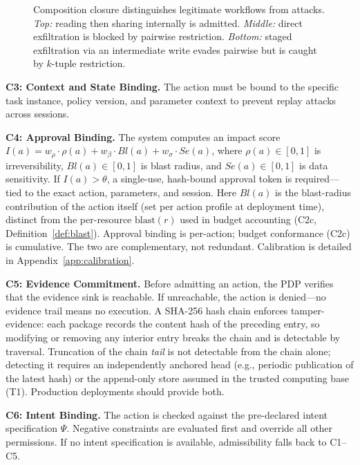 \documentclass[sigconf,nonacm]{acmart}
\begin{document}
\begin{figure}[t]
\caption{Composition closure distinguishes legitimate workflows from attacks. \emph{Top:} reading then sharing internally is admitted. \emph{Middle:} direct exfiltration is blocked by pairwise restriction. \emph{Bottom:} staged exfiltration via an intermediate write evades pairwise but is caught by $k$-tuple restriction.}
\label{fig:composition}
\end{figure}

\textbf{C3: Context and State Binding.} The action must be bound to the specific task instance, policy version, and parameter context to prevent replay attacks across sessions.

\textbf{C4: Approval Binding.} The system computes an impact score $I(a) = w_\rho \cdot \rho(a) + w_\beta \cdot Bl(a) + w_\sigma \cdot Se(a)$, where $\rho(a) \in [0,1]$ is irreversibility, $Bl(a) \in [0,1]$ is blast radius, and $Se(a) \in [0,1]$ is data sensitivity. If $I(a) > \theta$, a single-use, hash-bound approval token is required---tied to the exact action, parameters, and session. Here $Bl(a)$ is the blast-radius contribution of the action itself (set per action profile at deployment time), distinct from the per-resource $\mathrm{blast}(r)$ used in budget accounting (C2c, Definition~\ref{def:blast}). Approval binding is per-action; budget conformance (C2c) is cumulative. The two are complementary, not redundant. Calibration is detailed in Appendix~\ref{app:calibration}.

\textbf{C5: Evidence Commitment.} Before admitting an action, the PDP verifies that the evidence sink is reachable. If unreachable, the action is denied---no evidence trail means no execution. A SHA-256 hash chain enforces tamper-evidence: each package records the content hash of the preceding entry, so modifying or removing any interior entry breaks the chain and is detectable by traversal. Truncation of the chain \emph{tail} is not detectable from the chain alone; detecting it requires an independently anchored head (e.g., periodic publication of the latest hash) or the append-only store assumed in the trusted computing base (T1). Production deployments should provide both.

\textbf{C6: Intent Binding.} The action is checked against the pre-declared intent specification $\Psi$. Negative constraints are evaluated first and override all other permissions. If no intent specification is available, admissibility falls back to C1--C5.
\end{document}
